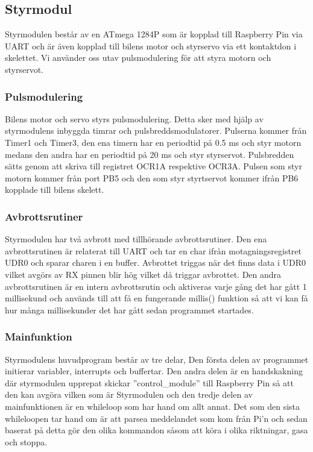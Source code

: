 \documentclass[10pt,oneside,swedish]{lips}
\begin{document}
\subsection{Styrmodul}
Styrmodulen består av en ATmega 1284P som är kopplad till Raspberry Pin via UART och är även kopplad till bilens motor och styrservo via ett kontaktdon i skelettet. Vi använder oss utav pulsmodulering för att styra motorn och styrservot.

\subsubsection{Pulsmodulering}
Bilens motor och servo styrs pulsmodulering. Detta sker med hjälp av styrmodulens inbyggda timrar och pulsbreddsmodulatorer. Pulserna kommer från Timer1 och Timer3, den ena timern har en periodtid på 0.5 ms och styr motorn medans den andra har en periodtid på 20 ms och styr styrservot. Pulsbredden sätts genom att skriva till registret OCR1A respektive OCR3A. Pulsen som styr motorn kommer från port PB5 och den som styr styrtservot kommer ifrån PB6 kopplade till bilens skelett. 

\subsubsection{Avbrottsrutiner}
Styrmodulen har två avbrott med tillhörande avbrottsrutiner. Den ena avbrottsrutinen är relaterat till UART och tar en char ifrån motagningsregistret UDR0 och sparar charen i en buffer. Avbrottet triggas när det finns data i UDR0 vilket avgörs av RX pinnen blir hög vilket då triggar avbrottet. Den andra avbrottsrutinen är en intern avbrottsrutin och aktiveras varje gång det har gått 1 millisekund och används till att få en fungerande millis() funktion så att vi kan få hur många millisekunder det har gått sedan programmet startades. 

\subsubsection{Mainfunktion}
Styrmodulens huvudprogram består av tre delar, Den första delen av programmet initierar variabler, interrupts och buffertar. Den andra delen är en handskakning där styrmodulen upprepat skickar ''control\_module'' till Raspberry Pin så att den kan avgöra vilken som är Styrmodulen och den tredje delen av mainfunktionen är en whileloop som har hand om allt annat. Det som den sista whileloopen tar hand om är att parsea meddelandet som kom från Pi'n och sedan baserat på detta gör den olika kommandon såsom att köra i olika riktningar, gasa och stoppa.
\end{document}
